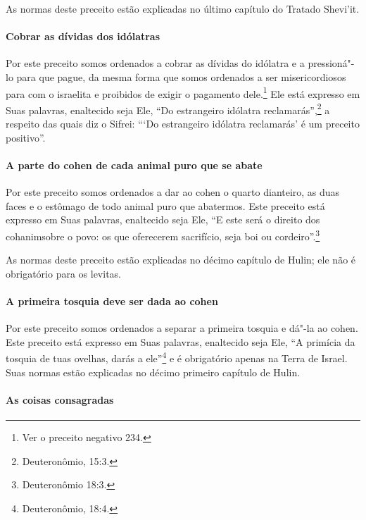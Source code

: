 \begin{multicols}{2}
As normas deste preceito estão explicadas no último capítulo do Tratado
Shevi'it\starr.

\paragraph{Cobrar as dívidas dos idólatras}

Por este preceito somos ordenados a cobrar as dívidas do idólatra e a
pressioná"-lo para que pague, da mesma forma que somos ordenados a ser
misericordiosos para com o israelita e proibidos de exigir o pagamento
dele.\footnote{Ver o preceito negativo 234.} Ele está expresso em Suas palavras,
enaltecido seja Ele, ``Do estrangeiro idólatra reclamarás'',\footnote{Deuteronômio, 15:3.} a respeito das quais diz o Sifrei\starr: ```Do
estrangeiro idólatra reclamarás' é um preceito positivo''.

\paragraph{A parte do cohen\starr{} de cada animal puro que se abate}

Por este preceito somos ordenados a dar ao cohen\starr{} o quarto
dianteiro, as duas faces e o estômago de todo animal puro que
abatermos. Este preceito está expresso em Suas palavras, enaltecido
seja Ele, ``E este será o direito dos cohanim\starr sobre o povo: os que
oferecerem sacrifício, seja boi ou cordeiro''.\footnote{Deuteronômio 18:3.}

As normas deste preceito estão explicadas no décimo capítulo de Hulin\starr;
ele não é obrigatório para os levitas\starr.

\paragraph{A primeira tosquia deve ser dada ao cohen\starr{}}

Por este preceito somos ordenados a separar a primeira tosquia e dá"-la
ao cohen\starr. Este preceito está expresso em Suas palavras, enaltecido
seja Ele, ``A primícia da tosquia de tuas ovelhas, darás a ele''\footnote{Deuteronômio, 18:4.} e é obrigatório apenas na Terra de Israel. Suas
normas estão explicadas no décimo primeiro capítulo de Hulin\starr.

\paragraph{As coisas consagradas}


\end{multicols}
